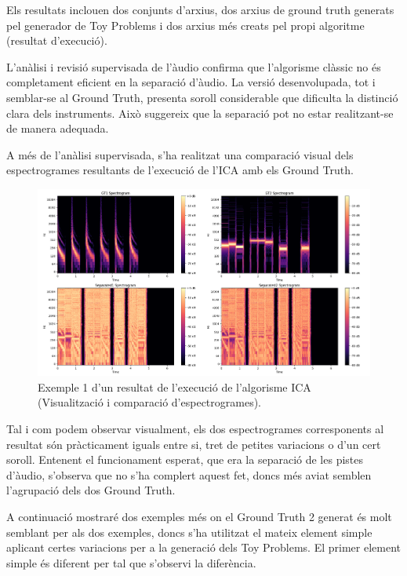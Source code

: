 \documentclass[10pt,a4paper,twocolumn,twoside]{article}
\begin{document}
Els resultats inclouen dos conjunts d'arxius, dos arxius de ground truth generats pel generador de Toy Problems i dos arxius més creats pel propi algoritme (resultat d'execució).

L'anàlisi i revisió supervisada de l'àudio confirma que l'algorisme clàssic no és completament eficient en la separació d'àudio. La versió desenvolupada, tot i semblar-se al Ground Truth, presenta soroll considerable que dificulta la distinció clara dels instruments. Això suggereix que la separació pot no estar realitzant-se de manera adequada.

A més de l'anàlisi supervisada, s'ha realitzat una comparació visual dels espectrogrames resultants de l'execució de l'ICA amb els Ground Truth.

\begin{figure}[h]
    \centering
    \includegraphics[width=1\linewidth]{img/ica_results/ica_results_spectogram_example_1.png}
    \caption{Exemple 1 d'un resultat de l'execució de l'algorisme ICA (Visualització i comparació d'espectrogrames).}
    \label{fig:ica_results-example1}
\end{figure}

Tal i com podem observar visualment, els dos espectrogrames corresponents al resultat són pràcticament iguals entre si, tret de petites variacions o d'un cert soroll.
Entenent el funcionament esperat, que era la separació de les pistes d'àudio, s'observa que no s'ha complert aquest fet, doncs més aviat semblen l'agrupació dels dos Ground Truth.

A continuació mostraré dos exemples més on el Ground Truth 2 generat és molt semblant per als dos exemples, doncs s'ha utilitzat el mateix element simple aplicant certes variacions per a la generació dels Toy Problems. El primer element simple és diferent per tal que s'observi la diferència.
\end{document}
